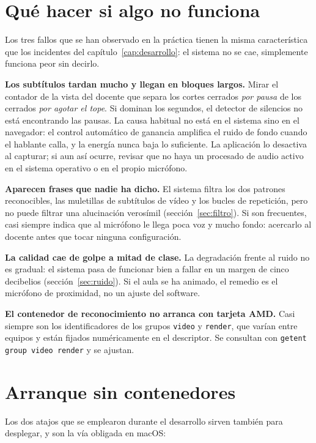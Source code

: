 \section{Qué hacer si algo no funciona}

Los tres fallos que se han observado en la práctica tienen la misma característica que los
incidentes del capítulo~\ref{cap:desarrollo}: el sistema no se cae, simplemente funciona
peor sin decirlo.

\textbf{Los subtítulos tardan mucho y llegan en bloques largos.} Mirar el contador de la
vista del docente que separa los cortes cerrados \emph{por pausa} de los cerrados \emph{por
agotar el tope}. Si dominan los segundos, el detector de silencios no está encontrando las
pausas. La causa habitual no está en el sistema sino en el navegador: el control automático
de ganancia amplifica el ruido de fondo cuando el hablante calla, y la energía nunca baja lo
suficiente. La aplicación lo desactiva al capturar; si aun así ocurre, revisar que no haya
un procesado de audio activo en el sistema operativo o en el propio micrófono.

\textbf{Aparecen frases que nadie ha dicho.} El sistema filtra los dos patrones
reconocibles, las muletillas de subtítulos de vídeo y los bucles de repetición, pero no
puede filtrar una alucinación verosímil (sección~\ref{sec:filtro}). Si son frecuentes, casi
siempre indica que al micrófono le llega poca voz y mucho fondo: acercarlo al docente antes
que tocar ninguna configuración.

\textbf{La calidad cae de golpe a mitad de clase.} La degradación frente al ruido no es
gradual: el sistema pasa de funcionar bien a fallar en un margen de cinco decibelios
(sección~\ref{sec:ruido}). Si el aula se ha animado, el remedio es el micrófono de
proximidad, no un ajuste del software.

\textbf{El contenedor de reconocimiento no arranca con tarjeta AMD.} Casi siempre son los
identificadores de los grupos \texttt{video} y \texttt{render}, que varían entre equipos y
están fijados numéricamente en el descriptor. Se consultan con
\texttt{getent group video render} y se ajustan.

\section{Arranque sin contenedores}

Los dos atajos que se emplearon durante el desarrollo sirven también para desplegar, y son
la vía obligada en macOS:

